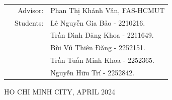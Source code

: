 \documentclass[a4paper]{article}
\begin{document}
\begin{titlepage}
\begin{table}[h]
	\begin{tabular}{rrl}
		\hspace{5 cm} & Advisor: & Phan Thị Khánh Vân, FAS-HCMUT\\[6pt]
		& Students: & Lê Nguyễn Gia Bảo \hspace*{0.05cm} - 2210216. \\
		& 			& Trần Đình Đăng Khoa \hspace*{0.15cm} - 2211649. \\
		& 			& Bùi Vũ Thiên Đăng	  \hspace*{0.41cm} - 2252151. \\
		& 			& Trần Tuấn Minh Khoa 	  \hspace*{0.5cm} - 2252365. \\
		& 			& Nguyễn Hữu Trí		  \hspace*{1.2cm} - 2252842. \\
	\end{tabular}
\end{table}

\vspace*{1cm}

\begin{center}
{\footnotesize HO CHI MINH CITY, APRIL 2024}
\end{center}
\end{titlepage}


\newpage
\tableofcontents

% 
% 




\clearpage


\nocite{*}
\end{document}
